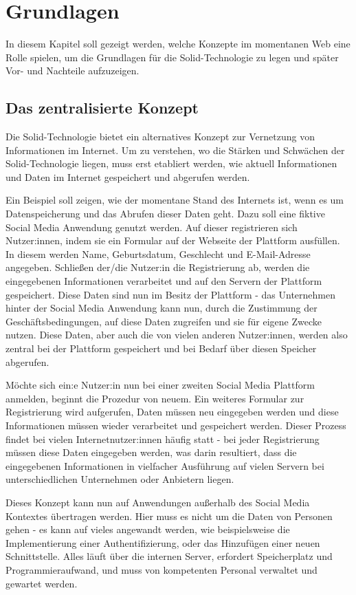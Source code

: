 \documentclass[acmtog]{acmart}
\begin{document}
\label{section:grundlagen}
\section{Grundlagen}
In diesem Kapitel soll gezeigt werden, welche Konzepte im momentanen Web eine Rolle spielen, um die Grundlagen für die Solid-Technologie zu legen und später Vor- und Nachteile aufzuzeigen.

\label{section:zentralisiertesKonzept}
\subsection{Das zentralisierte Konzept}
Die Solid-Technologie bietet ein alternatives Konzept zur Vernetzung von Informationen im Internet. Um zu verstehen, wo die Stärken und Schwächen der Solid-Technologie liegen, muss erst etabliert werden, wie aktuell Informationen und Daten im Internet gespeichert und abgerufen werden.

Ein Beispiel soll zeigen, wie der momentane Stand des Internets ist, wenn es um Datenspeicherung und das Abrufen dieser Daten geht. Dazu soll eine fiktive Social Media Anwendung genutzt werden. Auf dieser registrieren sich Nutzer:innen, indem sie ein Formular auf der Webseite der Plattform ausfüllen. In diesem werden Name, Geburtsdatum, Geschlecht und E-Mail-Adresse angegeben. Schließen der/die Nutzer:in die Registrierung ab, werden die eingegebenen Informationen verarbeitet und auf den Servern der Plattform gespeichert. Diese Daten sind nun im Besitz der Plattform - das Unternehmen hinter der Social Media Anwendung kann nun, durch die Zustimmung der Geschäftsbedingungen, auf diese Daten zugreifen und sie für eigene Zwecke nutzen. Diese Daten, aber auch die von vielen anderen Nutzer:innen, werden also zentral bei der Plattform gespeichert und bei Bedarf über diesen Speicher abgerufen.  

Möchte sich ein:e Nutzer:in nun bei einer zweiten Social Media Plattform anmelden, beginnt die Prozedur von neuem. Ein weiteres Formular zur Registrierung wird aufgerufen, Daten müssen neu eingegeben werden und diese Informationen müssen wieder verarbeitet und gespeichert werden. Dieser Prozess findet bei vielen Internetnutzer:innen häufig statt - bei jeder Registrierung müssen diese Daten eingegeben werden, was darin resultiert, dass die eingegebenen Informationen in vielfacher Ausführung auf vielen Servern bei unterschiedlichen Unternehmen oder Anbietern liegen. 

Dieses Konzept kann nun auf Anwendungen außerhalb des Social Media Kontextes übertragen werden. Hier muss es nicht um die Daten von Personen gehen - es kann auf vieles angewandt werden, wie beispielsweise die Implementierung einer Authentifizierung, oder das Hinzufügen einer neuen Schnittstelle. Alles läuft über die internen Server, erfordert Speicherplatz und Programmieraufwand, und muss von kompetenten Personal verwaltet und gewartet werden.
\end{document}
